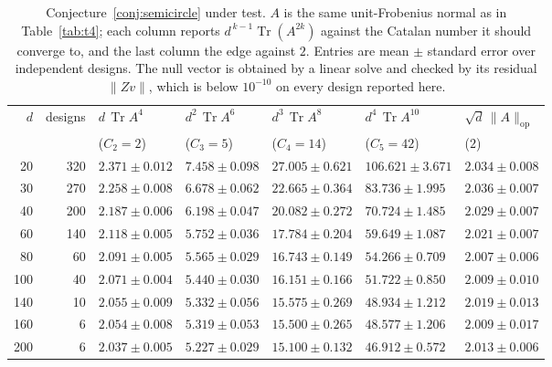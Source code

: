 \documentclass[11pt]{article}
\theoremstyle{definition}
\DeclareMathOperator{\Tr}{Tr}
\begin{document}
\begin{table}[t]
\centering\small
\caption{Conjecture~\ref{conj:semicircle} under test. $A$ is the same unit-Frobenius normal as in
Table~\ref{tab:t4}; each column reports $d^{\,k-1}\Tr(A^{2k})$ against the Catalan number it should
converge to, and the last column the edge against $2$. Entries are mean $\pm$ standard error over
independent designs. The null vector is obtained by a linear solve and checked by its residual
$\|Zv\|$, which is below $10^{-10}$ on every design reported here.}
\label{tab:moments}
{\setlength{\tabcolsep}{4.5pt}
\begin{tabular}{rrlllll}
\toprule
$d$ & designs & $d\,\Tr A^4$ & $d^2\,\Tr A^6$ & $d^3\,\Tr A^8$ & $d^4\,\Tr A^{10}$ &
$\sqrt d\,\|A\|_{\mathrm{op}}$\\
 & & ($C_2=2$) & ($C_3=5$) & ($C_4=14$) & ($C_5=42$) & ($2$)\\
\midrule
20 & 320 & $2.371\pm0.012$ & $7.458\pm0.098$ & $27.005\pm0.621$ & $106.621\pm3.671$ & $2.034\pm0.008$\\
30 & 270 & $2.258\pm0.008$ & $6.678\pm0.062$ & $22.665\pm0.364$ & $83.736\pm1.995$ & $2.036\pm0.007$\\
40 & 200 & $2.187\pm0.006$ & $6.198\pm0.047$ & $20.082\pm0.272$ & $70.724\pm1.485$ & $2.029\pm0.007$\\
60 & 140 & $2.118\pm0.005$ & $5.752\pm0.036$ & $17.784\pm0.204$ & $59.649\pm1.087$ & $2.021\pm0.007$\\
80 & 60 & $2.091\pm0.005$ & $5.565\pm0.029$ & $16.743\pm0.149$ & $54.266\pm0.709$ & $2.007\pm0.006$\\
100 & 40 & $2.071\pm0.004$ & $5.440\pm0.030$ & $16.151\pm0.166$ & $51.722\pm0.850$ & $2.009\pm0.010$\\
140 & 10 & $2.055\pm0.009$ & $5.332\pm0.056$ & $15.575\pm0.269$ & $48.934\pm1.212$ & $2.019\pm0.013$\\
160 & 6 & $2.054\pm0.008$ & $5.319\pm0.053$ & $15.500\pm0.265$ & $48.577\pm1.206$ & $2.009\pm0.017$\\
200 & 6 & $2.037\pm0.005$ & $5.227\pm0.029$ & $15.100\pm0.132$ & $46.912\pm0.572$ & $2.013\pm0.006$\\
\bottomrule
\end{tabular}}
\end{table}
\end{document}

